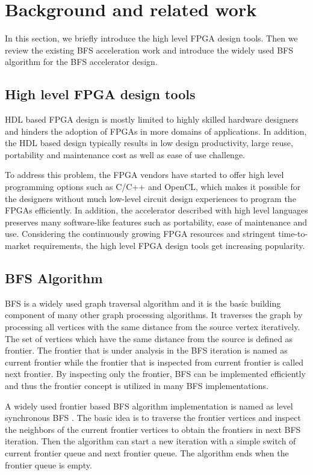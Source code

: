 \section{Background and related work} \label{sec:relatedwork}
In this section, we briefly introduce the high level FPGA design tools.
Then we review the existing BFS acceleration work and introduce the widely 
used BFS algorithm for the BFS accelerator design.

\subsection{High level FPGA design tools}
HDL based FPGA design is mostly limited to highly skilled 
hardware designers and hinders the adoption of FPGAs in more 
domains of applications. In addition, the HDL based design 
typically results in low design productivity, large reuse, 
portability and maintenance cost as well as ease of use 
challenge.
 
To address this problem, the FPGA vendors have started 
to offer high level programming options such as C/C++ and OpenCL, which makes 
it possible for the designers without much low-level circuit design 
experiences \cite{nimbix, xilinx-sdaccel, intel-opencl} 
to program the FPGAs efficiently. In addition, the accelerator 
described with high level languages preserves many software-like features 
such as portability, ease of maintenance and use. Considering the  
continuously growing FPGA resources and stringent time-to-market requirements, 
the high level FPGA design tools \cite{Nane2016hls-survey} get increasing popularity.

\subsection{BFS Algorithm}
BFS is a widely used graph traversal algorithm and it is the basic 
building component of many other graph processing algorithms. 
It traverses the graph by processing all vertices with the same distance from the 
source vertex iteratively. The set of vertices which have the same distance from the 
source is defined as frontier. The frontier that is under analysis in the BFS iteration 
is named as current frontier while the frontier that is inspected from current frontier 
is called next frontier. By inspecting only the frontier, BFS can be implemented efficiently 
and thus the frontier concept is utilized in many BFS implementations.

A widely used frontier based BFS algorithm implementation is named as 
level synchronous BFS \cite{attia2014cygraph, betkaoui2012reconfigurable, 
zhang2017boosting}. The basic idea is to traverse the frontier vertices 
and inspect the neighbors of the current frontier vertices to obtain the 
frontiers in next BFS iteration. Then the algorithm can start a new 
iteration with a simple switch of current frontier queue and next frontier queue. 
The algorithm ends when the frontier queue is empty.

